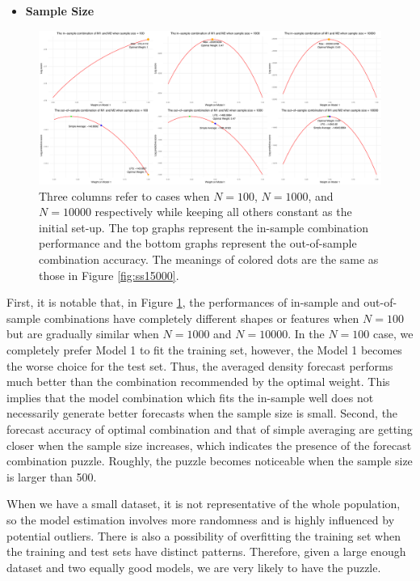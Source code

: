 \documentclass{monashthesis}
\begin{document}
\begin{itemize}
\tightlist
\item
  \bf{Sample Size}
\end{itemize}

\begin{figure}[ht]
\centering
\includegraphics[scale=0.35]{figures/Sample_Size_100-10000.png}
\caption{Three columns refer to cases when $N=100$, $N=1000$, and $N=10000$ respectively while keeping all others constant as the initial set-up. The top graphs represent the in-sample combination performance and the bottom graphs represent the out-of-sample combination accuracy. The meanings of colored dots are the same as those in Figure \ref{fig:ss15000}.}
\label{fig:ss}
\end{figure}

First, it is notable that, in Figure \ref{fig:ss}, the performances of in-sample and out-of-sample combinations have completely different shapes or features when \(N=100\) but are gradually similar when \(N=1000\) and \(N=10000\). In the \(N=100\) case, we completely prefer Model 1 to fit the training set, however, the Model 1 becomes the worse choice for the test set. Thus, the averaged density forecast performs much better than the combination recommended by the optimal weight. This implies that the model combination which fits the in-sample well does not necessarily generate better forecasts when the sample size is small. Second, the forecast accuracy of optimal combination and that of simple averaging are getting closer when the sample size increases, which indicates the presence of the forecast combination puzzle. Roughly, the puzzle becomes noticeable when the sample size is larger than 500.

When we have a small dataset, it is not representative of the whole population, so the model estimation involves more randomness and is highly influenced by potential outliers. There is also a possibility of overfitting the training set when the training and test sets have distinct patterns. Therefore, given a large enough dataset and two equally good models, we are very likely to have the puzzle.
\end{document}
